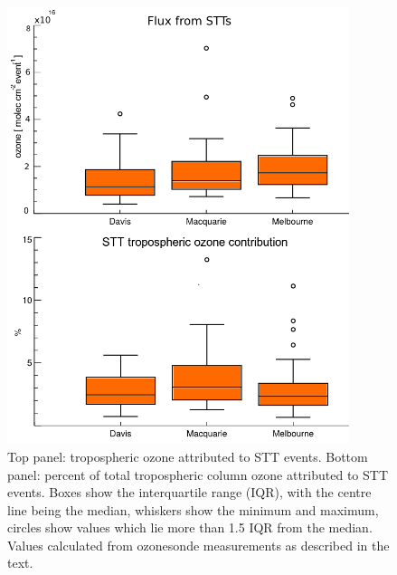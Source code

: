 \documentclass[acp, manuscript]{copernicus} %
\begin{document}
    \begin{figure}
      \includegraphics[width=10cm]{figures/Fluxes.png}
      \caption{%
	Top panel: tropospheric ozone attributed to STT events.
	Bottom panel: percent of total tropospheric column ozone attributed to STT events.
	Boxes show the interquartile range (IQR), with the centre line being the median, whiskers show the minimum and maximum, circles show values which lie more than 1.5 IQR from the median.
	Values calculated from ozonesonde measurements as described in the text.}
      \label{fig:fluxsummary}
    \end{figure}
    
\end{document}
